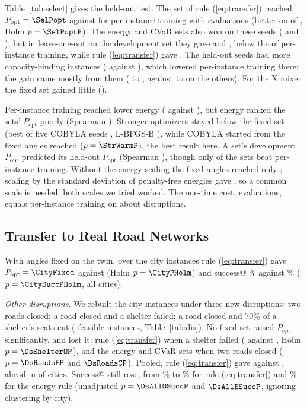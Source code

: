 \documentclass[conference]{IEEEtran}
\begin{document}
Table~\ref{tab:select} gives the held-out test. The set of rule (\ref{eq:transfer}) reached $P_{\mathrm{opt}}=\SelPopt$ against \SelTrained{} for per-instance training with \HoCumFour{} evaluations (better on \SelPoptWins{} of \HoN, Holm $p=\SelPoptP$). The energy and CVaR sets also won on these seeds (\SelEn{} and \SelCv), but in leave-one-out on the development set they gave \SelEnLoo{} and \SelCvLoo, below the \SelDevTrained{} of per-instance training, while rule (\ref{eq:transfer}) gave \SelPoptLoo. The held-out seeds had more capacity-binding instances (\HoNBind{} against \NBinding), which lowered per-instance training there; the gain came mostly from them (\HoBindTrained{} to \HoBindFixed, against \HoNonBindTrained{} to \HoNonBindFixed{} on the others). For the X mixer the fixed set gained little (\SelXPopt).

Per-instance training reached lower energy (\EnTrained{} against \EnFixed), but energy ranked the \CandN{} sets' $P_{\mathrm{opt}}$ poorly (Spearman \RhoEnPopt). Stronger optimizers stayed below the fixed set (best of five COBYLA seeds \SelBestFive, L-BFGS-B \SelLbfgs), while COBYLA started from the fixed angles reached \StrWarm{} ($p=\StrWarmP$), the best result here. A set's development $P_{\mathrm{opt}}$ predicted its held-out $P_{\mathrm{opt}}$ (Spearman \RhoDevHeld), though only \CandBeat{} of the \CandN{} sets beat per-instance training. Without the energy scaling the fixed angles reached only \NormNoneFixed; scaling by the standard deviation of penalty-free energies gave \NormStdFixed, so a common scale is needed; both scales we tried worked. The one-time cost, \OffTotal{} evaluations, equals per-instance training on about \OffBreakEven{} disruptions.

\subsection{Transfer to Real Road Networks}
With angles fixed on the twin, over the \CityN{} city instances rule (\ref{eq:transfer}) gave $P_{\mathrm{opt}}=\CityFixed$ against \CityTrained{} (Holm $p=\CityPHolm$) and success@\Shots{} \CitySuccFixed\% against \CitySuccTrained\% ($p=\CitySuccPHolm$, all \CitySuccPos{} cities).

\textit{Other disruptions.} We rebuilt the city instances under three new disruptions: two roads closed; a road closed and a shelter failed; a road closed and 70\% of a shelter's seats cut (\DsNTotal{} feasible instances, Table~\ref{tab:dis}). No fixed set raised $P_{\mathrm{opt}}$ significantly, and \DsLosses{} lost it: rule (\ref{eq:transfer}) when a shelter failed (\DsShelterO{} against \DsShelterTrained, Holm $p=\DsShelterOP$), and the energy and CVaR sets when two roads closed ($p=\DsRoadsEP$ and $\DsRoadsCP$). Pooled, rule (\ref{eq:transfer}) gave \DsAllO{} against \DsAllTrained, ahead in \DsAllOPos{} of \DsCities{} cities. Success@\Shots{} still rose, from \DsAllTrainedSucc\% to \DsAllOSucc\% for rule (\ref{eq:transfer}) and \DsAllESucc\% for the energy rule (unadjusted $p=\DsAllOSuccP$ and $\DsAllESuccP$, ignoring clustering by city).
\end{document}
